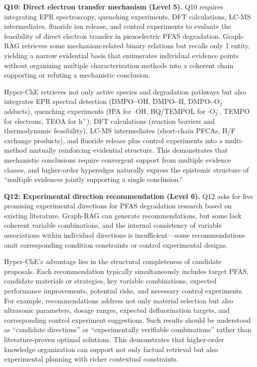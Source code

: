 \textbf{Q10: Direct electron transfer mechanism (Level 5).} Q10 requires integrating EPR spectroscopy, quenching experiments, DFT calculations, LC-MS intermediates, fluoride ion release, and control experiments to evaluate the feasibility of direct electron transfer in piezoelectric PFAS degradation. Graph-RAG retrieves some mechanism-related binary relations but recalls only 1 entity, yielding a narrow evidential basis that enumerates individual evidence points without organizing multiple characterization methods into a coherent chain supporting or refuting a mechanistic conclusion.

Hyper-ChE retrieves not only active species and degradation pathways but also integrates EPR spectral detection (DMPO-$\cdot$OH, DMPO-$\cdot$H, DMPO-$\cdot$O$_{2}^{-}$ adducts), quenching experiments (IPA for $\cdot$OH, BQ/TEMPOL for $\cdot$O$_{2}^{-}$, TEMPO for electrons, TEOA for h$^{+}$), DFT calculations (reaction barriers and thermodynamic feasibility), LC-MS intermediates (short-chain PFCAs, H/F exchange products), and fluoride release plus control experiments into a multi-method mutually reinforcing evidential structure. This demonstrates that mechanistic conclusions require convergent support from multiple evidence classes, and higher-order hyperedges naturally express the epistemic structure of ``multiple evidences jointly supporting a single conclusion.''

\textbf{Q12: Experimental direction recommendation (Level 6).} Q12 asks for five promising experimental directions for PFAS degradation research based on existing literature. Graph-RAG can generate recommendations, but some lack coherent variable combinations, and the internal consistency of variable associations within individual directions is insufficient---some recommendations omit corresponding condition constraints or control experimental designs.

Hyper-ChE's advantage lies in the structural completeness of candidate proposals. Each recommendation typically simultaneously includes target PFAS, candidate materials or strategies, key variable combinations, expected performance improvements, potential risks, and necessary control experiments. For example, recommendations address not only material selection but also ultrasonic parameters, dosage ranges, expected defluorination targets, and corresponding control experiment suggestions. Such results should be understood as ``candidate directions'' or ``experimentally verifiable combinations'' rather than literature-proven optimal solutions. This demonstrates that higher-order knowledge organization can support not only factual retrieval but also experimental planning with richer contextual constraints.


